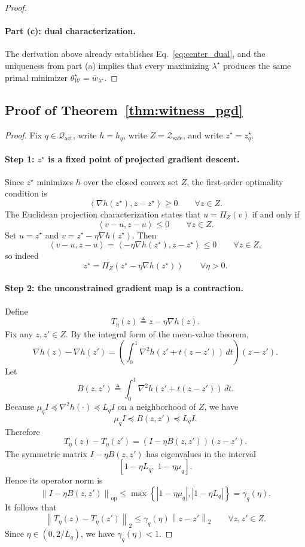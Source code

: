 \documentclass{article}
\newcommand{\cQ}{\mathcal{Q}}
\newcommand{\cW}{\mathcal{W}}
\newcommand{\cZ}{\mathcal{Z}}
\newcommand{\norm}[1]{\left\lVert #1 \right\rVert}
\newcommand{\abs}[1]{\left\lvert #1 \right\rvert}
\newcommand{\paren}[1]{\left( #1 \right)}
\newcommand{\bracks}[1]{\left[ #1 \right]}
\newcommand{\braces}[1]{\left\{ #1 \right\}}
\newcommand{\inner}[2]{\left\langle #1, #2 \right\rangle}
\newcommand{\safe}{\mathrm{safe}}
\newcommand{\act}{\mathrm{act}}
\begin{document}
\begin{proof}
\paragraph{Part (c): dual characterization.}
The derivation above already establishes Eq.~\eqref{eq:center_dual}, and the uniqueness from part (a) implies that every maximizing \(\lambda^\star\) produces the same primal minimizer \(\theta_{\cW}^\star=\bar w_{\lambda^\star}\).
\end{proof}

\subsection{Proof of Theorem~\ref{thm:witness_pgd}}

\begin{proof}
Fix \(q\in\cQ_{\act}\), write \(h=h_q\), write \(Z=\cZ_{\safe}\), and write \(z^\star=z_q^\star\).

\paragraph{Step 1: \(z^\star\) is a fixed point of projected gradient descent.}
Since \(z^\star\) minimizes \(h\) over the closed convex set \(Z\), the first-order optimality condition is
\[
\inner{\nabla h(z^\star)}{z-z^\star}\ge 0
\qquad
\forall z\in Z.
\]
The Euclidean projection characterization states that \(u=\Pi_Z(v)\) if and only if
\[
\inner{v-u}{z-u}\le 0
\qquad
\forall z\in Z.
\]
Set \(u=z^\star\) and \(v=z^\star-\eta \nabla h(z^\star)\). Then
\[
\inner{v-u}{z-u}
=
\inner{-\eta \nabla h(z^\star)}{z-z^\star}
\le 0
\qquad
\forall z\in Z,
\]
so indeed
\[
z^\star
=
\Pi_Z\paren{z^\star-\eta \nabla h(z^\star)}
\qquad
\forall \eta>0.
\]

\paragraph{Step 2: the unconstrained gradient map is a contraction.}
Define
\[
T_\eta(z)
\triangleq
z-\eta \nabla h(z).
\]
Fix any \(z,z'\in Z\). By the integral form of the mean-value theorem,
\[
\nabla h(z)-\nabla h(z')
=
\paren{
\int_0^1 \nabla^2 h\paren{z'+t(z-z')}\,dt
}(z-z').
\]
Let
\[
B(z,z')
\triangleq
\int_0^1 \nabla^2 h\paren{z'+t(z-z')}\,dt.
\]
Because \(\mu_q I \preceq \nabla^2 h(\cdot)\preceq L_q I\) on a neighborhood of \(Z\), we have
\[
\mu_q I \preceq B(z,z')\preceq L_q I.
\]
Therefore
\[
T_\eta(z)-T_\eta(z')
=
\paren{I-\eta B(z,z')}(z-z').
\]
The symmetric matrix \(I-\eta B(z,z')\) has eigenvalues in the interval
\[
\bracks{1-\eta L_q,\; 1-\eta \mu_q}.
\]
Hence its operator norm is
\[
\norm{I-\eta B(z,z')}_{\mathrm{op}}
\le
\max\braces{\abs{1-\eta \mu_q},\abs{1-\eta L_q}}
=
\gamma_q(\eta).
\]
It follows that
\begin{equation}
\norm{T_\eta(z)-T_\eta(z')}_2
\le
\gamma_q(\eta)\norm{z-z'}_2
\qquad
\forall z,z'\in Z.
\label{eq:pgd_contraction}
\end{equation}
Since \(\eta\in(0,2/L_q)\), we have \(\gamma_q(\eta)<1\).


\end{proof}
\end{document}
